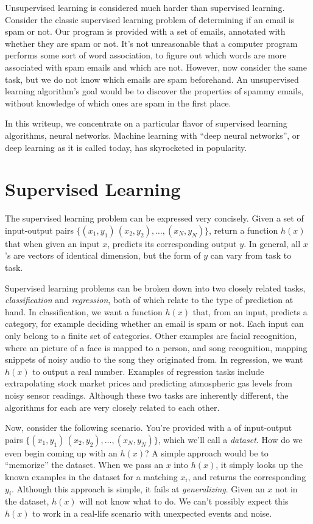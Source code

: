 \documentclass[a4paper,10pt]{article}
\begin{document}
Unsupervised learning is considered
much harder than supervised learning.
Consider the classic supervised learning problem 
of determining if an email is spam or not.
Our program is provided with
a set of emails, annotated with whether they are spam or not.
It's not unreasonable that a computer program performs
some sort of word association, to figure out
which words are more associated with spam emails
and which are not.
However, now consider the same task,
but we do not know which emails are spam beforehand.
An unsupervised learning algorithm's goal
would be to discover the properties of
spammy emails, without knowledge of which ones
are spam in the first place.

In this writeup, we concentrate on a particular
flavor of supervised learning algorithms,
neural networks. Machine learning with
``deep neural networks'', or deep learning 
as it is called today, has skyrocketed
in popularity.

\section{Supervised Learning}
The supervised learning problem can be expressed very concisely.
Given a set of input-output pairs $\{(x_1, y_1)\, (x_2, y_2), \ldots, (x_N, y_N)\}$,
return a function $h(x)$ that when given an
input $x$, predicts its corresponding output $y$.
In general, all $x$'s are vectors of identical dimension,
but the form of $y$ can vary from task to task.

Supervised learning problems can be broken down into
two closely related tasks, \emph{classification} and \emph{regression},
both of which relate to the type of prediction at hand.
In classification, we want a function $h(x)$ that, from an input,
predicts a category, for example
deciding whether an email is spam or not. Each input
can only belong to a finite set of categories. Other examples
are facial recognition, where an picture of a face is mapped to a person,
and song recognition, mapping snippets of noisy audio to the song they 
originated from.
In regression, we want $h(x)$ to output a real number. Examples of
regression tasks include extrapolating stock market prices 
and predicting atmospheric gas levels from noisy sensor readings.
Although these two tasks are inherently different,
the algorithms for each are very closely related to each other.

Now, consider the following scenario. You're provided
with a of input-output pairs $\{(x_1, y_1)\, (x_2, y_2), \ldots, (x_N, y_N)\}$,
which we'll call a \emph{dataset}.
How do we even begin coming up with an $h(x)$? A simple approach
would be to ``memorize'' the dataset. When we pass an $x$
into $h(x)$, it simply looks up the known examples
in the dataset for a matching $x_i$, and returns the corresponding
$y_i$. Although this approach is simple, it fails at \emph{generalizing}.
Given an $x$ not in the dataset, $h(x)$ will not know what to do.
We can't possibly expect this $h(x)$ to work in a real-life
scenario with unexpected events and noise.
\end{document}
